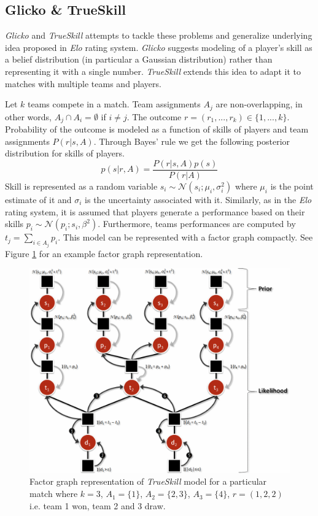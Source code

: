 \documentclass[12pt]{article}
\begin{document}
\subsection{Glicko \& TrueSkill}
\textit{Glicko} \cite{glickman1999parameter} and \textit{TrueSkill} \cite{minka2006trueskilll} attempts to tackle these problems and generalize underlying idea proposed in \textit{Elo} rating system. \textit{Glicko} suggests modeling of a player's skill as a belief distribution (in particular a Gaussian distribution) rather than representing it with a single number. \textit{TrueSkill} extends this idea to adapt it to matches with multiple teams and players.

Let $k$ teams compete in a match. Team assignments $A_j$ are non-overlapping, in other words, $A_j \cap A_i = \emptyset$ if $i \neq j$. The outcome $r = (r_1, ... , r_k) \in \{1, ..., k\}$. Probability of the outcome is modeled as a function of skills of players and team assignments $P(r | s, A)$. Through Bayes' rule we get the following posterior distribution for skills of players.
$$p(s | r, A) = \frac{P(r|s,A) p(s)}{P(r | A)}$$
Skill is represented as a random variable $s_i \sim \mathcal{N}(s_i;\mu_i,\sigma^2_i)$ where $\mu_i$ is the point estimate of it and $\sigma_i$ is the uncertainty associated with it. Similarly, as in the \textit{Elo} rating system, it is assumed that players generate a performance based on their skills $p_i \sim \mathcal{N}(p_i;s_i,\beta^2)$. Furthermore, teams performances are computed by $t_j = \sum_{i \in A_j} p_i$. This model can be represented with a factor graph compactly. See Figure \ref{factor_graph} for an example factor graph representation.

\begin{figure}[!ht]
	\includegraphics[width=1\columnwidth]{factor_graph}
	\caption{Factor graph representation of \textit{TrueSkill} model for a particular match where $k = 3$, $A_1 = \{1\}$, $A_2 = \{2,3\}$, $A_3 = \{4\}$, $r = (1,2,2)$ i.e. team 1 won, team 2 and 3 draw.}
	\label{factor_graph}
\end{figure}
\end{document}
